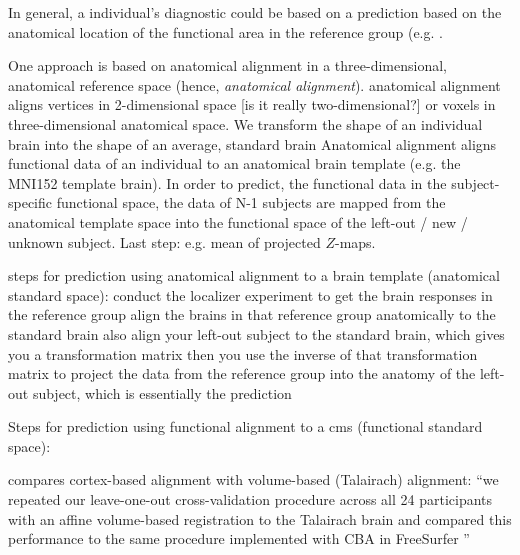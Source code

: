 


In general, a individual's diagnostic could be based on a prediction based on
the anatomical location of the functional area in the reference group (e.g.
\citet{weiner2018defining}.

One approach is based on anatomical alignment in a three-dimensional, anatomical
reference space (hence, \textit{anatomical alignment}).
%
anatomical alignment aligns vertices in 2-dimensional space [is it really
two-dimensional?] or voxels in three-dimensional anatomical space.
%
We transform the shape of an individual brain into the shape of an average,
standard brain
%
Anatomical alignment aligns functional data of an individual to an anatomical
brain template (e.g. the MNI152 template brain).
%
In order to predict, the functional data in the subject-specific functional
space, the data of N-1 subjects are mapped from the anatomical template space
into the functional space of the left-out / new / unknown subject.
%
Last step: e.g. mean of projected $Z$-maps.

steps for prediction using anatomical alignment to a brain template (anatomical
standard space):
%
conduct the localizer experiment to get the brain responses in the reference
group
%
align the brains in that reference group anatomically to the standard brain
%
also align your left-out subject to the standard brain, which gives you a
transformation matrix
%
then you use the inverse of that transformation matrix to project the data
%
from the reference group into the anatomy of the left-out subject, which is
essentially the prediction

Steps for prediction using functional alignment to a \ac{cms} (functional
standard space):

%
\citep{weiner2018defining} compares cortex-based alignment
\citep{fischl1999high} with volume-based (Talairach) alignment: ``we repeated
our leave-one-out cross-validation procedure across all 24 participants with an
affine volume-based registration to the Talairach brain and compared this
performance to the same procedure implemented with CBA in FreeSurfer
\citep{weiner2018defining}''


